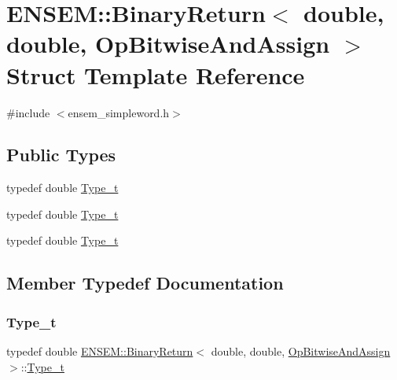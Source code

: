 \hypertarget{structENSEM_1_1BinaryReturn_3_01double_00_01double_00_01OpBitwiseAndAssign_01_4}{}\section{E\+N\+S\+EM\+:\+:Binary\+Return$<$ double, double, Op\+Bitwise\+And\+Assign $>$ Struct Template Reference}
\label{structENSEM_1_1BinaryReturn_3_01double_00_01double_00_01OpBitwiseAndAssign_01_4}


{\ttfamily \#include $<$ensem\+\_\+simpleword.\+h$>$}

\subsection*{Public Types}
\begin{DoxyCompactItemize}
\item 
typedef double \mbox{\hyperlink{structENSEM_1_1BinaryReturn_3_01double_00_01double_00_01OpBitwiseAndAssign_01_4_aa3e34db7c5a718f74845bd8e24088ed0}{Type\+\_\+t}}
\item 
typedef double \mbox{\hyperlink{structENSEM_1_1BinaryReturn_3_01double_00_01double_00_01OpBitwiseAndAssign_01_4_aa3e34db7c5a718f74845bd8e24088ed0}{Type\+\_\+t}}
\item 
typedef double \mbox{\hyperlink{structENSEM_1_1BinaryReturn_3_01double_00_01double_00_01OpBitwiseAndAssign_01_4_aa3e34db7c5a718f74845bd8e24088ed0}{Type\+\_\+t}}
\end{DoxyCompactItemize}


\subsection{Member Typedef Documentation}
\mbox{\label{structENSEM_1_1BinaryReturn_3_01double_00_01double_00_01OpBitwiseAndAssign_01_4_aa3e34db7c5a718f74845bd8e24088ed0}} 
\subsubsection{\texorpdfstring{Type\_t}{Type\_t}\hspace{0.1cm}{\footnotesize\ttfamily [1/3]}}
{\footnotesize\ttfamily typedef double \mbox{\hyperlink{structENSEM_1_1BinaryReturn}{E\+N\+S\+E\+M\+::\+Binary\+Return}}$<$ double, double, \mbox{\hyperlink{structENSEM_1_1OpBitwiseAndAssign}{Op\+Bitwise\+And\+Assign}} $>$\+::\mbox{\hyperlink{structENSEM_1_1BinaryReturn_3_01double_00_01double_00_01OpBitwiseAndAssign_01_4_aa3e34db7c5a718f74845bd8e24088ed0}{Type\+\_\+t}}}

